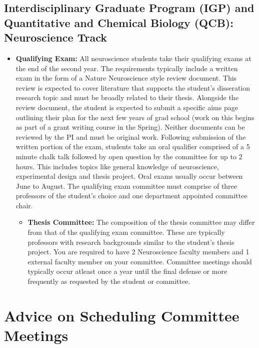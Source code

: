 \documentclass[
]{book}
\providecommand{\tightlist}{%
  \setlength{\itemsep}{0pt}\setlength{\parskip}{0pt}}
\begin{document}
\hypertarget{igp}{%
\subsection{Interdisciplinary Graduate Program (IGP) and Quantitative and Chemical Biology (QCB): Neuroscience Track}\label{igp}}

\begin{itemize}
\item
  \textbf{Qualifying Exam:} All neuroscience students take their qualifying exams at the end of the second year. The requirements typically include a written exam in the form of a Nature Neuroscience style review document. This review is expected to cover literature that supports the student's disseration research topic and must be broadly related to their thesis. Alongside the review document, the student is expected to submit a specific aims page outlining their plan for the next few years of grad school (work on this begins as part of a grant writing course in the Spring). Neither documents can be reviewed by the PI and must be original work. Following submission of the written portion of the exam, students take an oral qualifier comprised of a 5 minute chalk talk followed by open question by the committee for up to 2 hours. This includes topics like general knowledge of neuroscience, experimental design and thesis project. Oral exams usually occur between June to August. The qualifying exam committee must comprise of three professors of the student's choice and one department appointed committee chair.

  \begin{itemize}
  \tightlist
  \item
    \textbf{Thesis Committee:} The composition of the thesis committee may differ from that of the qualifying exam committee. These are typically professors with research backgrounds similar to the student's thesis project. You are required to have 2 Neuroscience faculty members and 1 external faculty member on your committee. Committee meetings should typically occur atleast once a year until the final defense or more frequently as requested by the student or committee.
  \end{itemize}
\end{itemize}

\hypertarget{advice-on-scheduling-committee-meetings}{%
\section{Advice on Scheduling Committee Meetings}\label{advice-on-scheduling-committee-meetings}}
\end{document}
